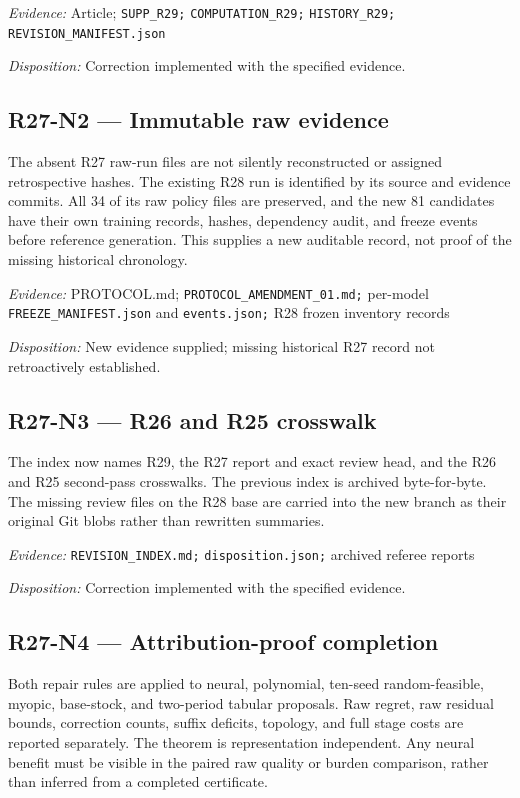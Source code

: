 \emph{Evidence:} Article; \nolinkurl{SUPP_R29;} \nolinkurl{COMPUTATION_R29;} \nolinkurl{HISTORY_R29;} \nolinkurl{REVISION_MANIFEST.json}

\emph{Disposition:} Correction implemented with the specified evidence.
\subsection{R27-N2 --- Immutable raw evidence}
The absent R27 raw-run files are not silently reconstructed or assigned retrospective hashes. The existing R28 run is identified by its source and evidence commits. All 34 of its raw policy files are preserved, and the new 81 candidates have their own training records, hashes, dependency audit, and freeze events before reference generation. This supplies a new auditable record, not proof of the missing historical chronology.

\emph{Evidence:} PROTOCOL.md; \nolinkurl{PROTOCOL_AMENDMENT_01.md;} per-model \nolinkurl{FREEZE_MANIFEST.json} and \nolinkurl{events.json;} R28 frozen inventory records

\emph{Disposition:} New evidence supplied; missing historical R27 record not retroactively established.
\subsection{R27-N3 --- R26 and R25 crosswalk}
The index now names R29, the R27 report and exact review head, and the R26 and R25 second-pass crosswalks. The previous index is archived byte-for-byte. The missing review files on the R28 base are carried into the new branch as their original Git blobs rather than rewritten summaries.

\emph{Evidence:} \nolinkurl{REVISION_INDEX.md;} \nolinkurl{disposition.json;} archived referee reports

\emph{Disposition:} Correction implemented with the specified evidence.
\subsection{R27-N4 --- Attribution-proof completion}
Both repair rules are applied to neural, polynomial, ten-seed random-feasible, myopic, base-stock, and two-period tabular proposals. Raw regret, raw residual bounds, correction counts, suffix deficits, topology, and full stage costs are reported separately. The theorem is representation independent. Any neural benefit must be visible in the paired raw quality or burden comparison, rather than inferred from a completed certificate.

